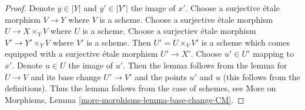 \documentclass[10pt,a4paper]{amsart}
\theoremstyle{plain}
\theoremstyle{definition}
\theoremstyle{remark}
\numberwithin{equation}{subsection}
\begin{document}
\begin{proof}
Denote $y \in |Y|$ and $y' \in |Y'|$ the image of $x'$.
Choose a surjective \'etale morphism $V \to Y$ where $V$ is a scheme.
Choose a surjective \'etale morphism $U \to X \times_Y V$ where
$U$ is a scheme.
Choose a surjectiev \'etale morphism $V' \to Y' \times_Y V$
where $V'$ is a scheme.
Then $U' = U \times_V V'$ is a scheme which comes equipped
with a surjective \'etale morphism $U' \to X'$.
Choose $u' \in U'$ mapping to $x'$. Denote $u \in U$ the image of $u'$.
Then the lemma follows from the lemma for
$U \to V$ and its base change $U' \to V'$ and the
points $u'$ and $u$ (this follows from the definitions).
Thus the lemma follows from the case of schemes, see
More on Morphisms, Lemma \ref{more-morphisms-lemma-base-change-CM}.
\end{proof}
\end{document}

